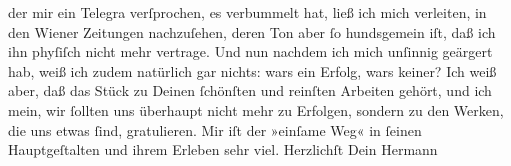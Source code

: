 \begin{ledgroupsized}[t]{13cm}
               der mir ein Telegra{\geminationm} verſprochen, es verbummelt hat,
               ließ ich mich verleiten, in den Wiener Zeitungen
               nachzuſehen, deren Ton aber ſo hundsgemein iſt, daß ich ihn phyſiſch nicht mehr
               vertrage. Und nun nachdem ich mich unſinnig geärgert hab, weiß ich zudem natürlich
               gar nichts: wars ein Erfolg, wars keiner? Ich weiß aber, daß das Stück zu Deinen ſchönſten und reinſten
               Arbeiten gehört, und ich mein, wir ſollten uns überhaupt nicht mehr zu Erfolgen,
               sondern zu den Werken, die uns etwas ſind, gratulieren. Mir iſt der »einſame Weg« in ſeinen Hauptgeſtalten und ihrem
               Erleben sehr viel.\pend
           \pstart Herzlichſt \hspace*{1.5em}Dein \spacefill\mbox{Hermann}\pend{}
         
         \endnumbering{}\end{ledgroupsized}  \newcommand{\dateiname}{L01373}\newcommand{\titel}{Hermann Bahr an Arthur Schnitzler, 15. 2. 1904}\newcommand{\editorInnen}{ Kurt Ifkovits,  Martin Anton Müller}
      